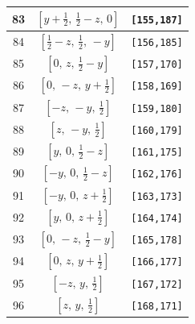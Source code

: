 \documentclass[fleqn,8pt]{jsarticle}
\begin{document}
\begin{longtable}{ccc}
83 & $\left[ y + \frac{1}{2},\, \frac{1}{2} - z,\, 0 \right]$ & {\tt [155,187]} \\ \hline
84 & $\left[ \frac{1}{2} - z,\, \frac{1}{2},\, - y \right]$ & {\tt [156,185]} \\ \hline
85 & $\left[ 0,\, z,\, \frac{1}{2} - y \right]$ & {\tt [157,170]} \\ \hline
86 & $\left[ 0,\, - z,\, y + \frac{1}{2} \right]$ & {\tt [158,169]} \\ \hline
87 & $\left[ - z,\, - y,\, \frac{1}{2} \right]$ & {\tt [159,180]} \\ \hline
88 & $\left[ z,\, - y,\, \frac{1}{2} \right]$ & {\tt [160,179]} \\ \hline
89 & $\left[ y,\, 0,\, \frac{1}{2} - z \right]$ & {\tt [161,175]} \\ \hline
90 & $\left[ - y,\, 0,\, \frac{1}{2} - z \right]$ & {\tt [162,176]} \\ \hline
91 & $\left[ - y,\, 0,\, z + \frac{1}{2} \right]$ & {\tt [163,173]} \\ \hline
92 & $\left[ y,\, 0,\, z + \frac{1}{2} \right]$ & {\tt [164,174]} \\ \hline
93 & $\left[ 0,\, - z,\, \frac{1}{2} - y \right]$ & {\tt [165,178]} \\ \hline
94 & $\left[ 0,\, z,\, y + \frac{1}{2} \right]$ & {\tt [166,177]} \\ \hline
95 & $\left[ - z,\, y,\, \frac{1}{2} \right]$ & {\tt [167,172]} \\ \hline
96 & $\left[ z,\, y,\, \frac{1}{2} \right]$ & {\tt [168,171]} \\
\end{longtable}
\renewcommand{\arraystretch}{1.2}
\end{document}
